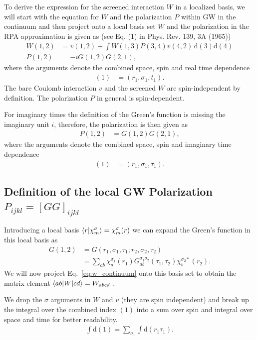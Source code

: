 \documentclass[12pt,a4paper]{scrartcl}
\numberwithin{equation}{section}
\begin{document}
To derive the expression for the screened interaction $W$ in a localized basis,
we will start with the equation for $W$ and the polarization $P$ within GW in the
continuum and then project onto a local basis set
$W$ and the polarization in the RPA approximation is given as
(see Eq. (1) in Phys. Rev. 139, 3A (1965))
\begin{align}
W(1,2)
 &= v(1,2)
  + \int  W(1,3) P(3,4) v(4,2) \, \mathrm{d}(3)\mathrm{d}(4) \label{eq:w_continuum} \\
%
P(1,2) &= -i G(1,2)G(2,1),
\end{align}
where the arguments denote the combined space, spin and real time dependence
\begin{align}
 (1) &= (r_1,\sigma_1,t_1).
\end{align}
The bare Coulomb interaction $v$ and the screened $W$ are spin-independent by definition.
The polarization $P$ in general is spin-dependent.

For imaginary times the definition of the Green's function
is missing the imaginary unit $i$, therefore, the polarization is then
given as
\begin{align}
P(1,2) &=  G(1,2)G(2,1),
\end{align}
where the arguments denote the combined space, spin and imaginary time dependence
\begin{align}
 (1) &= (r_1,\sigma_1,\tau_1).
\end{align}


\subsection{Definition of the local GW Polarization $P_{ijkl}=[GG]_{ijkl}$}

Introducing a local basis 
$\braket{r|\chi_{m}^{\sigma}}=\chi_{m}^{\sigma}(r)$ we can
expand the Green's function in this local basis as
\begin{align}
G(1,2) &=  G(r_1,\sigma_1,\tau_1;r_2,\sigma_2,\tau_2) \\
 &= \sum_{ab} \chi_{a}^{\sigma_1}(r_1) G^{\sigma_1\sigma_2}_{ab}(\tau_1,\tau_2)\chi_{b}^{\sigma_2*}(r_2). 
\end{align}
We will now project Eq.~\eqref{eq:w_continuum} onto this basis set to obtain the
matrix element $\braket{ab|W|cd} = W_{abcd}$ .

We drop the $\sigma$ arguments in $W$ and $v$ (they are spin independent) 
and break up the integral over the combined index $(1)$ into a sum over spin and integral over space and 
time for better readability.
\begin{align}
 \int \mathrm{d}(1) = \sum_{\sigma_1} \int\mathrm{d}(r_1\tau_1) .
\end{align}
\end{document}
